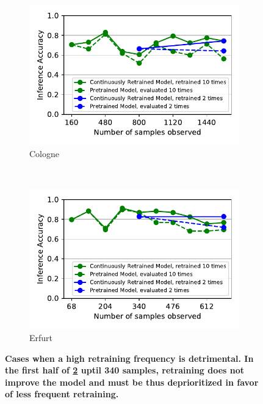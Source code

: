 \begin{figure}[t]
  \centering
  \begin{subfigure}[t]{0.5\linewidth}
    \centering
    \includegraphics[width=\linewidth]{figures/motivation/incr_learn_tasksize/motivation_tasksize_cologne.pdf}
    \caption{\small Cologne}
    \label{fig:cologne-motivation}
  \end{subfigure}  
  ~~
  \begin{subfigure}[t]{0.5\linewidth}
    \centering
    \includegraphics[width=\linewidth]{figures/motivation/incr_learn_tasksize/motivation_tasksize_erfurt.pdf}
    \caption{\small Erfurt}
    \label{fig:erfurt-motivation}
  \end{subfigure}
  \caption{\bf\small Cases when a high retraining frequency is detrimental. In the first half of \ref{fig:erfurt-motivation} uptil 340 samples, retraining does not improve the model and must be thus deprioritized in favor of less frequent retraining. }
  \label{fig:cityscapes-frequency-motivation}
\end{figure}


